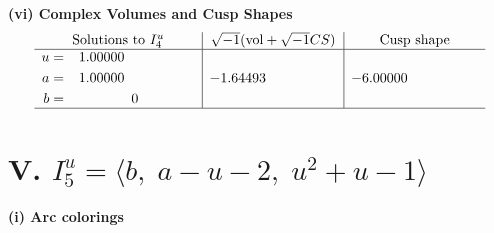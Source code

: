 \documentclass[1p]{elsarticle_modified}
\theoremstyle{definition}
\newcommand{\I}{\sqrt{-1}}
\begin{document}
\newpage\flushleft \textbf{(vi) Complex Volumes and Cusp Shapes}
$$\begin{array}{c|c|c}  
\text{Solutions to }I^u_{4}& \I (\text{vol} + \sqrt{-1}CS) & \text{Cusp shape}\\
 \hline 
\begin{aligned}
u &= \phantom{-}1.00000\phantom{ +0.000000I} \\
a &= \phantom{-}1.00000\phantom{ +0.000000I} \\
b &= \phantom{-0.000000 } 0\end{aligned}
 & -1.64493\phantom{ +0.000000I} & -6.00000\phantom{ +0.000000I}\\
 \hline 
 \end{array}$$\newpage\newpage\renewcommand{\arraystretch}{1}
\centering \section*{V. $I^u_{5}= \langle b,\;a- u-2,\;u^2+u-1 \rangle$}
\flushleft \textbf{(i) Arc colorings}\\
\end{document}
